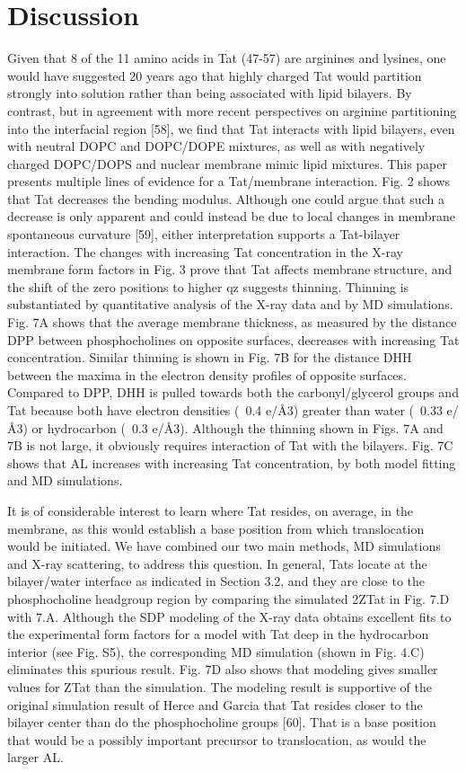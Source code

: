 \section{Discussion}
Given that 8 of the 11 amino acids in Tat (47-57) are arginines and lysines, 
one would have
suggested 20 years ago that highly charged Tat would partition strongly into 
solution rather than
being associated with lipid bilayers. By contrast, but in agreement with more 
recent perspectives
on arginine partitioning into the interfacial region [58], we find that Tat
interacts with lipid
bilayers, even with neutral DOPC and DOPC/DOPE mixtures, as well as with 
negatively
charged DOPC/DOPS and nuclear membrane mimic lipid mixtures. This paper 
presents
multiple lines of evidence for a Tat/membrane interaction. Fig. 2 shows that 
Tat decreases the
bending modulus. Although one could argue that such a decrease is only apparent 
and could
instead be due to local changes in membrane spontaneous curvature [59], either 
interpretation
supports a Tat-bilayer interaction. The changes with increasing Tat 
concentration in the X-ray
membrane form factors in Fig. 3 prove that Tat affects membrane structure, 
and the shift of the
zero positions to higher qz suggests thinning. Thinning is substantiated by 
quantitative analysis
of the X-ray data and by MD simulations. Fig. 7A shows that the average 
membrane thickness,
as measured by the distance DPP between phosphocholines on opposite surfaces, 
decreases with
increasing Tat concentration. Similar thinning is shown in Fig. 7B for the 
distance DHH between
the maxima in the electron density profiles of opposite surfaces. Compared to 
DPP, DHH is pulled
towards both the carbonyl/glycerol groups and Tat because both have electron 
densities (~0.4
e/Å3) greater than water (~0.33 e/Å3) or hydrocarbon (~0.3 e/Å3). Although 
the thinning shown
in Figs. 7A and 7B is not large, it obviously requires interaction of Tat with 
the bilayers. Fig.
7C shows that AL increases with increasing Tat concentration, by both model 
fitting and MD
simulations.

It is of considerable interest to learn where Tat resides, on average, in the 
membrane, as
this would establish a base position from which translocation would be initiated.
We have
combined our two main methods, MD simulations and X-ray scattering, to address 
this question.
In general, Tats locate at the bilayer/water interface as indicated in Section 3.2, 
and they are
close to the phosphocholine headgroup region by comparing the simulated 2ZTat
in Fig. 7.D with
7.A. Although the SDP modeling of the X-ray data obtains excellent fits to the experimental
form factors for a model with Tat deep in the hydrocarbon interior (see Fig. S5), the
corresponding MD simulation (shown in Fig. 4.C) eliminates this spurious result. Fig. 7D also
shows that modeling gives smaller values for ZTat than the simulation. The modeling result is
supportive of the original simulation result of Herce and Garcia that Tat resides closer to the
bilayer center than do the phosphocholine groups [60]. That is a base position that would be a
possibly important precursor to translocation, as would the larger AL.

